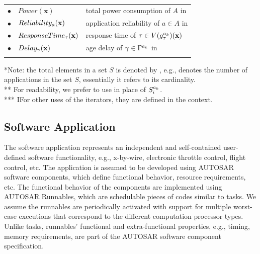 \begin{table}[]
\begin{tabular}{@{}llp{}@{}}
$\bullet$ & $Power(\textbf{x})$                		& total power consumption of  $A$ in \ttx    \\
$\bullet$ & $Reliability_{a}(\textbf{x})$      					& application reliability  of $a\in A$ in \ttx              \\
$\bullet$ & $ResponseTime_{\tau}(\textbf{x})$     		& response time of  $\tau \in V(\sss{g}[k][\tau])(\x)$                       \\
$\bullet$ & $Delay_\gamma(\textbf{x})$            			& age delay of $\gamma \in \ssp{\Gamma} $   in \ttx     \\
\bottomrule\\
\end{tabular}
{\footnotesize 
	*Note: the total elements in a set $S$ is denoted by , e.g.,  denotes the number of applications in the set $S$, essentially it refers to its cardinality.\\
	** For readability, we prefer to use  in place of $\sss{S}[k]$. \\
   *** IFor other uses of the iterators, they are defined in the context.}
 
\end{table}

\subsection{Software Application}
The software application represents an independent and self-contained user-defined software functionality, e.g., x-by-wire, electronic throttle control, flight control, etc. The application is assumed to be developed using AUTOSAR software components, which define functional behavior, resource requirements, etc. The functional behavior of the components are implemented using AUTOSAR Runnables, which are schedulable pieces of codes similar to tasks. We assume the runnables are periodically activated with support for multiple worst-case executions that correspond to the different computation processor types. Unlike tasks, runnables' functional and extra-functional properties, e.g., timing, memory requirements, are part of the AUTOSAR software component specification.



